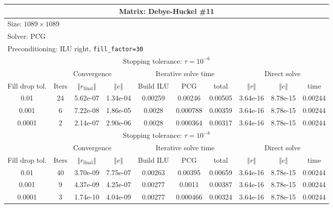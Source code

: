 \documentclass[oneside,final]{amsart}  %
\begin{document}
\begin{tabular}{|c|c|c|c|c|c|c|c|c|c|}
\hline
\multicolumn{10}{|c|}{Matrix: Debye-Huckel \#11}\tabularnewline
\hline
  \multicolumn{10}{|l|}{Size: $1089\times1089$}\tabularnewline
\hline
\multicolumn{10}{|l|}{Solver: PCG}\tabularnewline
\hline
\multicolumn{10}{|l|}{Preconditioning: ILU right, \texttt{fill\_factor=30}}\tabularnewline
\hline
\hline
\multicolumn{10}{|c|}{Stopping tolerance: $\tau=10^{-6}$}\tabularnewline
\hline
\hline
 & \multicolumn{3}{c|}{Convergence} & \multicolumn{3}{c|}{Iterative solve time} & \multicolumn{3}{c|}{Direct solve}\tabularnewline
\hline
Fill drop tol.  & Iters & $\left\Vert r_{\text{final}}\right\Vert $  & $\left\Vert e\right\Vert $  & Build ILU  & PCG  & total  & $\left\Vert r\right\Vert $ & $\left\Vert e\right\Vert $  & time\tabularnewline
\hline
  0.01 & 24 & 5.62e-07 & 1.34e-04 &    0.00259 &    0.00246 &    0.00505 & 3.64e-16 & 8.78e-15 &    0.00244\\
  \hline
  0.001 & 6 & 7.22e-08 & 1.86e-05 &     0.0028 &   0.000788 &    0.00359 & 3.64e-16 & 8.78e-15 &    0.00244\\
  \hline
  0.0001 & 2 & 2.14e-07 & 2.90e-06 &     0.0028 &   0.000364 &    0.00317 & 3.64e-16 & 8.78e-15 &    0.00244\\
  \hline
\hline
\multicolumn{10}{|c|}{Stopping tolerance: $\tau=10^{-8}$}\tabularnewline
\hline
\hline
 & \multicolumn{3}{c|}{Convergence} & \multicolumn{3}{c|}{Iterative solve time} & \multicolumn{3}{c|}{Direct solve }\tabularnewline
\hline
Fill drop tol.  & Iters  & $\left\Vert r_{\text{final}}\right\Vert $  & $\left\Vert e\right\Vert $ & Build ILU  & PCG  & total  & $\left\Vert r\right\Vert $  & $\left\Vert e\right\Vert $  & time\tabularnewline
\hline
  0.01 & 40 & 3.70e-09 & 7.75e-07 &    0.00263 &    0.00395 &    0.00659 & 3.64e-16 & 8.78e-15 &    0.00244\\
  \hline
  0.001 & 9 & 4.37e-09 & 4.25e-07 &    0.00277 &     0.0011 &    0.00387 & 3.64e-16 & 8.78e-15 &    0.00244\\
  \hline
  0.0001 & 3 & 1.74e-10 & 4.04e-09 &    0.00277 &   0.000466 &    0.00324 & 3.64e-16 & 8.78e-15 &    0.00244\\
  \hline
\end{tabular}
\end{document}
